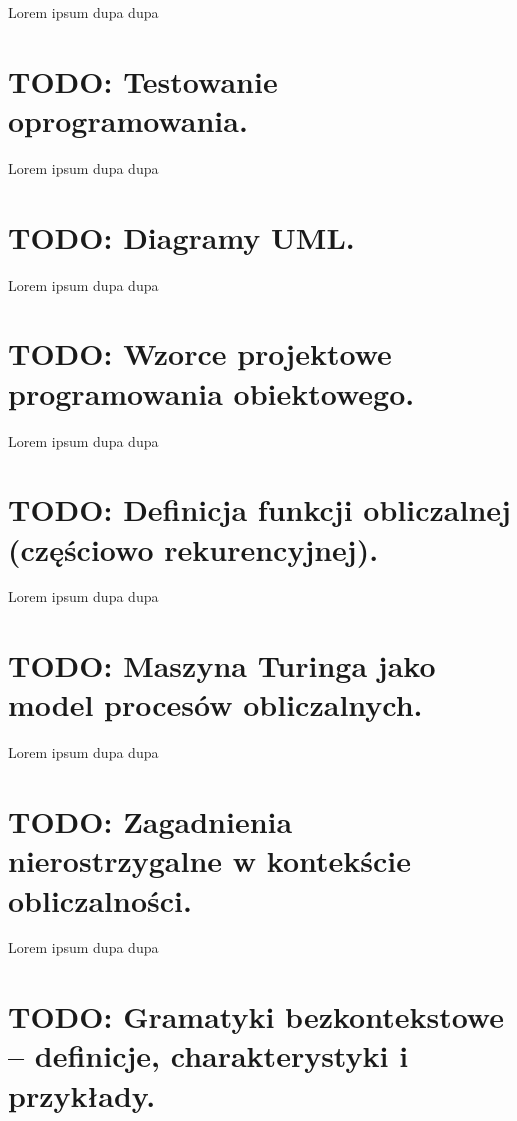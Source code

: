 \documentclass[a4paper,12pt,oneside]{book}
\begin{document}
					Lorem ipsum dupa dupa
	
	\setcounter{section}{40}
	\section{\color{red} TODO: Testowanie oprogramowania. }
					
					Lorem ipsum dupa dupa
	
	\setcounter{section}{41}
	\section{\color{red} TODO: Diagramy UML. }
					
					Lorem ipsum dupa dupa
	
	\setcounter{section}{42}
	\section{\color{red} TODO:  Wzorce projektowe programowania obiektowego. }
					
					Lorem ipsum dupa dupa
	
	\setcounter{section}{43}
	\section{\color{red} TODO: Definicja funkcji obliczalnej (częściowo rekurencyjnej). }
					
					Lorem ipsum dupa dupa
	
	\setcounter{section}{44}
	\section{\color{red} TODO: Maszyna Turinga jako model procesów obliczalnych. }
					
					Lorem ipsum dupa dupa
	
	\setcounter{section}{45}
	\section{\color{red} TODO: Zagadnienia nierostrzygalne w kontekście obliczalności. }
					
					Lorem ipsum dupa dupa
	
	\setcounter{section}{48}
	\section{\color{red} TODO:  Gramatyki bezkontekstowe – definicje, charakterystyki i przykłady. }
					
\end{document}
